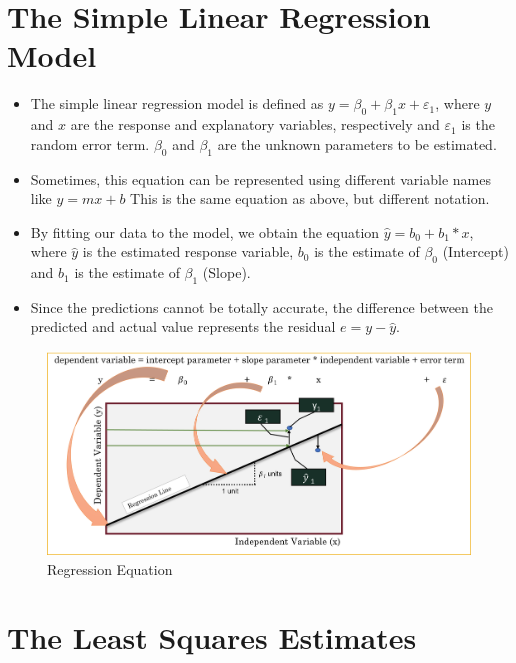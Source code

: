 \documentclass[
  letterpaper,
  DIV=11,
  numbers=noendperiod]{scrreprt}
\providecommand{\tightlist}{%
  \setlength{\itemsep}{0pt}\setlength{\parskip}{0pt}}\usepackage{longtable,booktabs,array}
\begin{document}
\section{The Simple Linear Regression
Model}\label{the-simple-linear-regression-model}

\begin{itemize}
\tightlist
\item
  The simple linear regression model is defined as
  \(y= \beta_0+\beta_1 𝑥+\varepsilon_1\), where \(y\) and \(x\) are the
  response and explanatory variables, respectively and \(\varepsilon_1\)
  is the random error term. \(\beta_0\) and \(\beta_1\) are the unknown
  parameters to be estimated.
\item
  Sometimes, this equation can be represented using different variable
  names like \(y=mx+b\) This is the same equation as above, but
  different notation.
\item
  By fitting our data to the model, we obtain the equation
  \(\hat{y} = b_0 + b_1*x\), where \(\hat{y}\) is the estimated response
  variable, \(b_0\) is the estimate of \(\beta_0\) (Intercept) and
  \(b_1\) is the estimate of \(\beta_1\) (Slope).
\item
  Since the predictions cannot be totally accurate, the difference
  between the predicted and actual value represents the residual
  \(e=y-\hat{y}\).
\end{itemize}

\begin{figure}[H]

{\centering \includegraphics{Pictures/Ch9/RegressEquation.png}

}

\caption{Regression Equation}

\end{figure}%

\section{The Least Squares Estimates}\label{the-least-squares-estimates}
\end{document}
